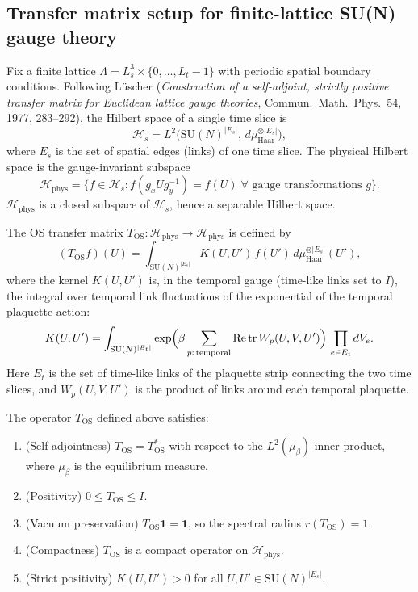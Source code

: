 \subsection{Transfer matrix setup for finite-lattice SU(N) gauge theory}
\label{ssec:pf_tm_setup}

Fix a finite lattice $\Lambda = L_{s}^{3}\times\{0,\ldots,L_{t}-1\}$ with
periodic spatial boundary conditions. Following L\"uscher (\emph{Construction
of a self-adjoint, strictly positive transfer matrix for Euclidean lattice gauge
theories}, Commun.~Math.~Phys.~54, 1977, 283--292), the Hilbert space of
a single time slice is
\[
\mathcal{H}_{s} = L^{2}\bigl(\mathrm{SU}(N)^{|E_{s}|},\,d\mu_{\mathrm{Haar}}^{\otimes|E_{s}|}\bigr),
\]
where $E_{s}$ is the set of spatial edges (links) of one time slice.  The
physical Hilbert space is the gauge-invariant subspace
\[
\mathcal{H}_{\mathrm{phys}} = \{f\in\mathcal{H}_{s} :
f(g_{x}Ug_{y}^{-1}) = f(U)\;\forall\text{ gauge transformations }g\}.
\]
$\mathcal{H}_{\mathrm{phys}}$ is a closed subspace of $\mathcal{H}_{s}$, hence a
separable Hilbert space.

The OS transfer matrix $T_{\mathrm{OS}}:\mathcal{H}_{\mathrm{phys}}\to\mathcal{H}_{\mathrm{phys}}$
is defined by
\[
(T_{\mathrm{OS}}f)(U) = \int_{\mathrm{SU}(N)^{|E_{s}|}}
K(U,U')\,f(U')\,d\mu_{\mathrm{Haar}}^{\otimes|E_{s}|}(U'),
\]
where the kernel $K(U,U')$ is, in the temporal gauge (time-like links set to
$I$), the integral over temporal link fluctuations of the exponential of the
temporal plaquette action:
\begin{equation}
\label{eq:tm_kernel}
K(U,U') = \int_{\mathrm{SU}(N)^{|E_{t}|}}
\exp\Bigl(\beta\sum_{p:\,\mathrm{temporal}}\operatorname{Re}\operatorname{tr}W_{p}(U,V,U')\Bigr)\,
\prod_{e\in E_{t}} dV_{e}.
\end{equation}
Here $E_{t}$ is the set of time-like links of the plaquette strip connecting the
two time slices, and $W_{p}(U,V,U')$ is the product of links around each temporal
plaquette.

\begin{lemma}
\label{lem:tm_properties}
The operator $T_{\mathrm{OS}}$ defined above satisfies:
\begin{enumerate}
\item \textup{(Self-adjointness)} $T_{\mathrm{OS}} = T_{\mathrm{OS}}^{*}$ with
  respect to the $L^{2}(\mu_{\beta})$ inner product, where $\mu_{\beta}$ is the
  equilibrium measure.
\item \textup{(Positivity)} $0 \le T_{\mathrm{OS}} \le I$.
\item \textup{(Vacuum preservation)} $T_{\mathrm{OS}}\mathbf{1} = \mathbf{1}$,
  so the spectral radius $r(T_{\mathrm{OS}}) = 1$.
\item \textup{(Compactness)} $T_{\mathrm{OS}}$ is a compact operator on
  $\mathcal{H}_{\mathrm{phys}}$.
\item \textup{(Strict positivity)} $K(U,U')>0$ for all $U,U'\in\mathrm{SU}(N)^{|E_{s}|}$.
\end{enumerate}
\end{lemma}

